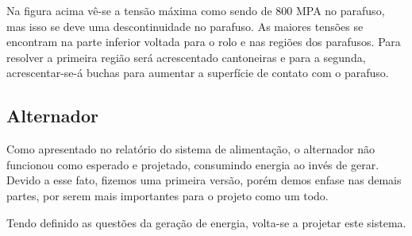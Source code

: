 
    Na figura acima vê-se a tensão máxima como sendo de 800 MPA no parafuso, mas isso se deve uma descontinuidade no parafuso. As maiores tensões se encontram na parte inferior voltada para o rolo e nas regiões dos parafusos. Para resolver a primeira região será acrescentado cantoneiras e para a segunda, acrescentar-se-á buchas para aumentar a superfície de contato com o parafuso.

\subsection{Alternador}
    Como apresentado no relatório do sistema de alimentação, o alternador não funcionou como esperado e projetado, consumindo energia ao invés de gerar. Devido a esse fato, fizemos uma primeira versão, porém demos enfase nas demais partes, por serem mais importantes para o projeto como um todo.

    
    Tendo definido as questões da geração de energia, volta-se a projetar este sistema.
